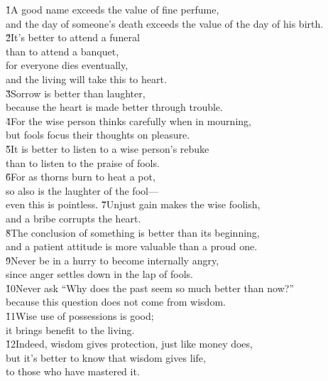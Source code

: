 \begin{poetry}
\poeml {}
\v{1}A good name exceeds the value of fine perfume, \\
\poemll    and the day of someone's death exceeds the value of the day of his birth. \\
\poeml \v{2}It's better to attend a funeral \\
\poemll    than to attend a banquet, \\
\poeml for everyone dies eventually, \\
\poemll    and the living will take this to heart. \\
\poeml \v{3}Sorrow is better than laughter, \\
\poemll    because the heart is made better through trouble. \\
\poeml \v{4}For the wise person thinks carefully when in mourning, \\
\poemll    but fools focus their thoughts on pleasure. \\
\poeml \v{5}It is better to listen to a wise person's rebuke \\
\poemll    than to listen to the praise of fools. \\
\poeml \v{6}For as thorns burn to heat a pot, \\
\poemll    so also is the laughter of the fool--- \\
\poemlll       even this is pointless.
\poeml \v{7}Unjust gain makes the wise foolish, \\
\poemll    and a bribe corrupts the heart. \\
\poeml \v{8}The conclusion of something is better than its beginning, \\
\poemll    and a patient attitude is more valuable than a proud one. \\
\poeml \v{9}Never be in a hurry to become internally angry, \\
\poemll    since anger settles down in the lap of fools. \\
\poeml \v{10}Never ask ``Why does the past seem so much better than now?'' \\
\poemll    because this question does not come from wisdom. \\
\poeml \v{11}Wise use of possessions is good; \\
\poemll    it brings benefit to the living. \\
\poeml \v{12}Indeed, wisdom gives protection, just like money does, \\
\poemll    but it's better to know that wisdom gives life, \\
\poemlll       to those who have mastered it.
\end{poetry}


